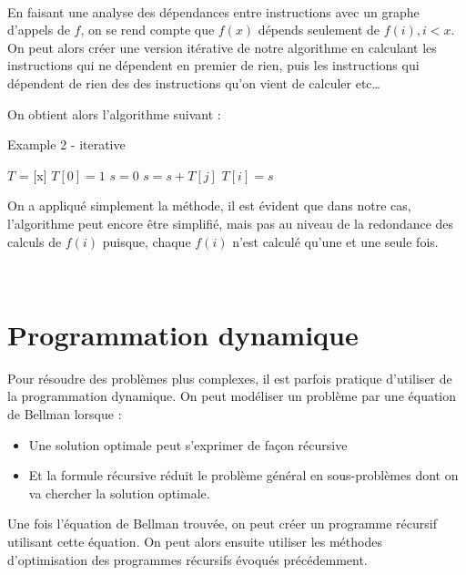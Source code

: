 \documentclass[
  paper=a4,
  ,captions=tableheading
]{scrartcl}
\providecommand{\tightlist}{%
  \setlength{\itemsep}{0pt}\setlength{\parskip}{0pt}}
\begin{document}
~

En faisant une analyse des dépendances entre instructions avec un graphe
d'appels de \(f\), on se rend compte que \(f(x)\) dépends seulement de
\(f(i), i<x\). On peut alors créer une version itérative de notre
algorithme en calculant les instructions qui ne dépendent en premier de
rien, puis les instructions qui dépendent de rien des des instructions
qu'on vient de calculer etc\ldots{}

On obtient alors l'algorithme suivant :

\begin{algorithm}[H]
\caption{Example 2 - iterative}
\begin{algorithmic}[6]
\Statex
    \State $T$ = [x]
    \State $T[0] = 1$
      \State $s=0$
        \State $s = s + T[j]$
      \EndFor
      \State $T[i] = s$
    \EndFor
  \EndFunction
\end{algorithmic}
\end{algorithm}

On a appliqué simplement la méthode, il est évident que dans notre cas,
l'algorithme peut encore être simplifié, mais pas au niveau de la
redondance des calculs de \(f(i)\) puisque, chaque \(f(i)\) n'est
calculé qu'une et une seule fois.

~\\
\hspace*{0.333em}

\hypertarget{programmation-dynamique}{%
\section{Programmation dynamique}\label{programmation-dynamique}}

Pour résoudre des problèmes plus complexes, il est parfois pratique
d'utiliser de la programmation dynamique. On peut modéliser un problème
par une équation de Bellman lorsque :

\begin{itemize}
\tightlist
\item
  Une solution optimale peut s'exprimer de façon récursive\\
\item
  Et la formule récursive réduit le problème général en sous-problèmes
  dont on va chercher la solution optimale.
\end{itemize}

Une fois l'équation de Bellman trouvée, on peut créer un programme
récursif utilisant cette équation. On peut alors ensuite utiliser les
méthodes d'optimisation des programmes récursifs évoqués précédemment.
\end{document}
